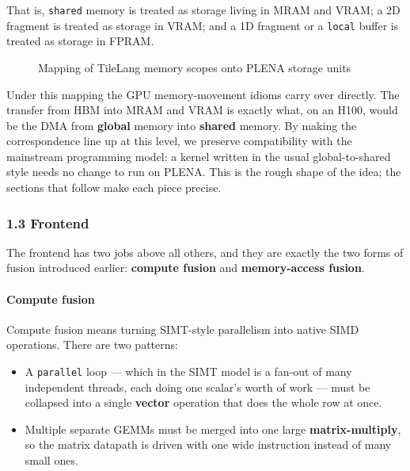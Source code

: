 \documentclass[
  10pt,
]{article}
\providecommand{\tightlist}{%
  \setlength{\itemsep}{0pt}\setlength{\parskip}{0pt}}
\begin{document}
That is, \texttt{shared} memory is treated as storage living in MRAM and
VRAM; a 2D fragment is treated as storage in VRAM; and a 1D fragment or
a \texttt{local} buffer is treated as storage in FPRAM.

\begin{figure}
\centering
\caption{Mapping of TileLang memory scopes onto PLENA storage units}
\end{figure}

Under this mapping the GPU memory-movement idioms carry over directly.
The transfer from HBM into MRAM and VRAM is exactly what, on an H100,
would be the DMA from \textbf{global} memory into \textbf{shared}
memory. By making the correspondence line up at this level, we preserve
compatibility with the mainstream programming model: a kernel written in
the usual global-to-shared style needs no change to run on PLENA. This
is the rough shape of the idea; the sections that follow make each piece
precise.

\subsubsection{1.3 Frontend}\label{isa-compiler-frontend}

The frontend has two jobs above all others, and they are exactly the two
forms of fusion introduced earlier: \textbf{compute fusion} and
\textbf{memory-access fusion}.

\paragraph{Compute fusion}\label{frontend-compute-fusion}

Compute fusion means turning SIMT-style parallelism into native SIMD
operations. There are two patterns:

\begin{itemize}
\tightlist
\item
  A \texttt{parallel} loop --- which in the SIMT model is a fan-out of
  many independent threads, each doing one scalar's worth of work ---
  must be collapsed into a single \textbf{vector} operation that does
  the whole row at once.
\item
  Multiple separate GEMMs must be merged into one large
  \textbf{matrix-multiply}, so the matrix datapath is driven with one
  wide instruction instead of many small ones.
\end{itemize}
\end{document}
